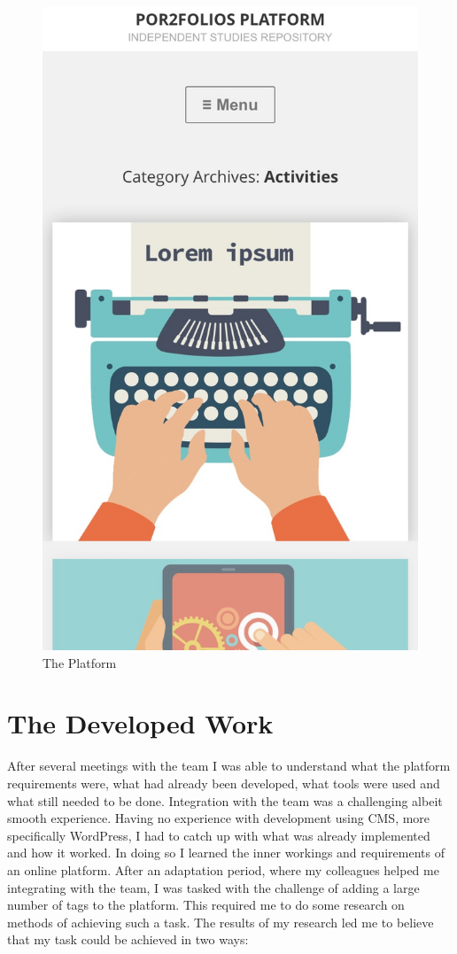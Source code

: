 \documentclass[a4paper,12pt,journal,twoside,compsoc]{PPIEEEtran}
\begin{document}
\begin{figure}[htb]
	\centering
	\includegraphics[width=1\linewidth]{mobile.png}
	\caption{The Platform}
	\label{fig_sim}
\end{figure}

\section{The Developed Work} 
After several meetings with the team I was able to understand what the platform requirements were, what had already been developed, what tools were used and what still needed to be done. Integration with the team was a challenging albeit smooth experience. Having no experience with development using \ac{CMS}, more specifically WordPress,  I had to catch up with what was already implemented and how it worked. In doing so I learned the inner workings and requirements of an online platform. After an adaptation period, where my colleagues helped me integrating with the team, I was tasked with the challenge of adding a large number of tags to the platform. This required me to do some research on methods of achieving such a task. The results of my research led me to believe that my task could be achieved in two ways:
\end{document}
